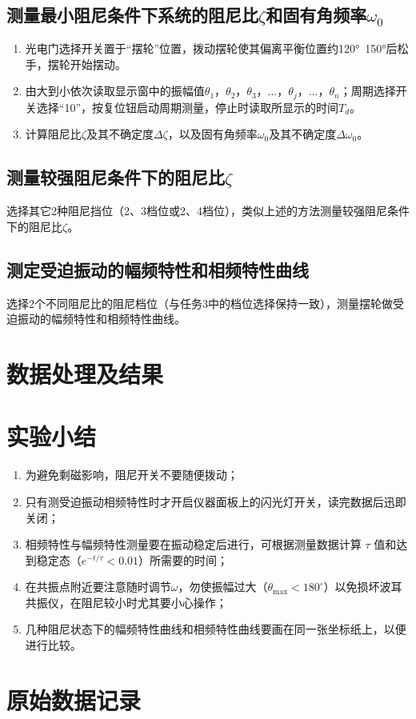 \documentclass[12pt,a4paper]{amsart}
\begin{document}
\subsection{测量最小阻尼条件下系统的阻尼比$\zeta$和固有角频率$\omega_0$}
\begin{enumerate}
    \item 光电门选择开关置于“摆轮”位置，拨动摆轮使其偏离平衡位置约120°~150°后松手，摆轮开始摆动。
    \item 由大到小依次读取显示窗中的振幅值$\theta_1$，$\theta_2$，$\theta_3$，$\dots$，$\theta_j$，$\dots$，$\theta_n$；周期选择开关选择“10”，按复位钮启动周期测量，停止时读取所显示的时间$T_d$。
    \item 计算阻尼比$\zeta$及其不确定度$\Delta\zeta$，以及固有角频率$\omega_0$及其不确定度$\Delta\omega_0$。
\end{enumerate}

\subsection{测量较强阻尼条件下的阻尼比$\zeta$}
选择其它2种阻尼挡位（2、3档位或2、4档位），类似上述的方法测量较强阻尼条件下的阻尼比$\zeta$。

\subsection{测定受迫振动的幅频特性和相频特性曲线}
选择2个不同阻尼比的阻尼档位（与任务3中的档位选择保持一致），测量摆轮做受迫振动的幅频特性和相频特性曲线。

\section{数据处理及结果}
\section{实验小结}

\begin{enumerate}
    \item 为避免剩磁影响，阻尼开关不要随便拨动；
    \item 只有测受迫振动相频特性时才开启仪器面板上的闪光灯开关，读完数据后迅即关闭；
    \item 相频特性与幅频特性测量要在振动稳定后进行，可根据测量数据计算 $\tau$ 值和达到稳定态（$e^{-t/\tau}<0.01$）所需要的时间；
    \item 在共振点附近要注意随时调节$\omega$，勿使振幅过大（$\theta_{\text{max}}<180^\circ$）以免损坏波耳共振仪，在阻尼较小时尤其要小心操作；
    \item 几种阻尼状态下的幅频特性曲线和相频特性曲线要画在同一张坐标纸上，以便进行比较。
\end{enumerate}

\section{原始数据记录}


\appendix



{\footnotesize}
\end{document}
